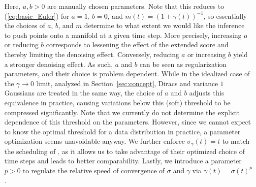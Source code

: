 \documentclass{article}
\theoremstyle{plain}
\theoremstyle{definition}
\theoremstyle{remark}
\begin{document}
Here, $a,b>0$ are manually chosen parameters. Note that this reduces to (\ref{eq:basic_Euler}) for $a=1$, $b=0$, and $m(t)=(1+\gamma(t))^{-1}$, so essentially the choices of $a$, $b$, and $m$ determine to what extent we would like the inference to push points onto a manifold at a given time step. More precisely, increasing $a$ or reducing $b$ corresponds to lessening the effect of the extended score and thereby limiting the denoising effect. Conversely, reducing $a$ or increasing $b$ yield a stronger denoising effect. As such, $a$ and $b$ can be seen as regularization parameters, and their choice is problem dependent. While in the idealized case of the $\gamma\to 0$ limit, analyzed in Section~\ref{sec:concept}, Diracs and variance $1$ Gaussians are treated in the same way, the choice of $a$ and $b$ adjusts this equivalence in practice, causing variations below this (soft) threshold to be compressed significantly. Note that we currently do not determine the explicit dependence of this threshold on the parameters. However, since we cannot expect to know the optimal threshold for a data distribution in practice, a parameter optimization seems unavoidable anyway. We further enforce $\sigma_\gamma(t)=t$ to match the scheduling of \cite{edm}, as it allows us to take advantage of their optimized choice of time steps and leads to better comparability. Lastly, we introduce a parameter $p>0$ to regulate the relative speed of convergence of $\sigma$ and $\gamma$ via $\gamma(t)=\sigma(t)^p$.
\end{document}
